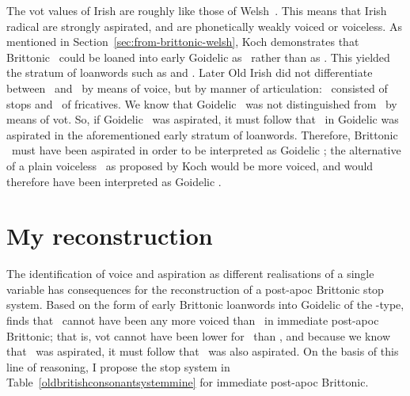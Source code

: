 The \gls{vot} values of Irish are roughly like those of Welsh~\autocite[85--86]{OD_Irish92}. This means that Irish radical  are strongly aspirated, and  are phonetically weakly voiced or voiceless. As mentioned in Section~\ref{sec:from-brittonic-welsh}, Koch demonstrates that Brittonic \lT\ could be loaned into early Goidelic as \lT\ rather than as \xD. This yielded the stratum of loanwords such as  and . Later Old Irish did not differentiate between \xT\ and \lT\ by means of voice, but by manner of articulation: \xT\ consisted of stops and \lT\ of fricatives. We know that Goidelic \lT\ was not distinguished from \xT\ by means of \gls{vot}. So, if Goidelic \xT\ was aspirated, it must follow that \lT\ in Goidelic was aspirated in the aforementioned early stratum of loanwords. Therefore, Brittonic \lT\ must have been aspirated in order to be interpreted as Goidelic \lT; the alternative of a plain voiceless \lT\ as proposed by Koch would be more voiced, and would therefore have been interpreted as Goidelic \xD. 

\section{My reconstruction}
\label{sec:my-reconstruction}
The identification of voice and aspiration as different realisations of a single variable has consequences for the reconstruction of a post-\gls{apoc} Brittonic stop system. Based on the form of early Brittonic loanwords into Goidelic of the -type, \textcite{koch_*cothairche_1990} finds that \lT\ cannot have been any more voiced than \xT\ in immediate post-\gls{apoc} Brittonic; that is, \gls{vot} cannot have been lower for \lT\ than \xT, and because we know that \xT\ was aspirated, it must follow that \lT\ was also aspirated. On the basis of this line of reasoning, I propose the stop system in Table~\ref{oldbritishconsonantsystemmine} for immediate post-\gls{apoc} Brittonic.

